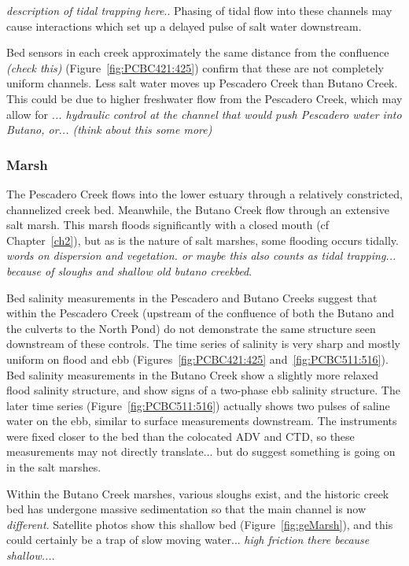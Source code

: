  \emph{description of tidal trapping here}.. Phasing of tidal flow into these channels may cause interactions which set up a delayed pulse of salt water downstream. 

Bed sensors in each creek approximately the same distance from the confluence \emph{(check this)} (Figure~\ref{fig:PCBC421:425}) confirm that these are not completely uniform channels. Less salt water moves up Pescadero Creek than Butano Creek. This could be due to higher freshwater flow from the Pescadero Creek, which may allow for \emph{... hydraulic control at the channel that would push Pescadero water into Butano, or... (think about this some more)} 

\subsubsection{Marsh}
The Pescadero Creek flows into the lower estuary through a relatively constricted, channelized creek bed.  Meanwhile, the Butano Creek flow through an extensive salt marsh. This marsh floods significantly with a closed mouth (cf Chapter~\ref{ch2}), but as is the nature of salt marshes, some flooding occurs tidally. \emph{words on dispersion and vegetation. or maybe this also counts as tidal trapping... because of sloughs and shallow old butano creekbed}. 

Bed salinity measurements in the Pescadero and Butano Creeks suggest that within the Pescadero Creek (upstream of the confluence of both the Butano and the culverts to the North Pond) do not demonstrate the same structure seen downstream of these controls. The time series of salinity is very sharp and mostly uniform on flood and ebb (Figures~\ref{fig:PCBC421:425} and~\ref{fig:PCBC511:516}). Bed salinity measurements in the Butano Creek show a slightly more relaxed flood salinity structure, and show signs of a two-phase ebb salinity structure. The later time series (Figure~\ref{fig:PCBC511:516}) actually shows two pulses of saline water on the ebb, similar to surface measurements downstream.  The instruments were fixed closer to the bed than the colocated ADV and CTD, so these measurements may not directly translate... but do suggest something is going on in the salt marshes.  

Within the Butano Creek marshes, various sloughs exist, and the historic creek bed has undergone massive sedimentation so that the main channel is now \emph{different}. Satellite photos show this shallow bed (Figure~\ref{fig:geMarsh}), and this could certainly be a trap of slow moving water... \emph{high friction there because shallow...}. 


